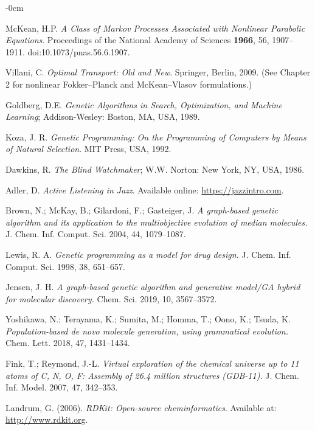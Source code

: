 \documentclass[life,article,submit,pdftex,moreauthors]{Definitions/mdpi}
\begin{document}
\begin{adjustwidth}{-\extralength}{0cm}
{\begin{thebibliography}{999}
McKean, H.P. 
\textit{A Class of Markov Processes Associated with Nonlinear Parabolic Equations}. 
Proceedings of the National Academy of Sciences \textbf{1966}, 56, 1907–1911. doi:10.1073/pnas.56.6.1907.

Villani, C. 
\textit{Optimal Transport: Old and New}. Springer, Berlin, 2009. 
(See Chapter 2 for nonlinear Fokker–Planck and McKean–Vlasov formulations.)

Goldberg, D.E. \textit{Genetic Algorithms in Search, Optimization, and Machine Learning}; Addison-Wesley: Boston, MA, USA, 1989.

Koza, J. R.
\textit{Genetic Programming: On the Programming of Computers by Means of Natural Selection}.
MIT Press, USA, 1992.

Dawkins, R. \textit{The Blind Watchmaker}; W.W. Norton: New York, NY, USA, 1986.

Adler, D. \textit{Active Listening in Jazz}. Available online: \url{https://jazzintro.com}.

Brown, N.; McKay, B.; Gilardoni, F.; Gasteiger, J.
\textit{A graph-based genetic algorithm and its application to the multiobjective
evolution of median molecules.}
J. Chem. Inf. Comput. Sci. 2004, 44, 1079--1087.

Lewis, R. A.
\textit{Genetic programming as a model for drug design.}
J. Chem. Inf. Comput. Sci. 1998, 38, 651--657.

Jensen, J. H.
\textit{A graph-based genetic algorithm and generative model/GA hybrid for molecular discovery.}
Chem. Sci. 2019, 10, 3567--3572.

Yoshikawa, N.; Terayama, K.; Sumita, M.; Homma, T.; Oono, K.; Tsuda, K.
\textit{Population-based de novo molecule generation, using grammatical evolution.}
Chem. Lett. 2018, 47, 1431--1434.

Fink, T.; Reymond, J.-L.
\textit{Virtual exploration of the chemical universe up to 11 atoms of C, N, O, F:
Assembly of 26.4 million structures (GDB-11).}
J. Chem. Inf. Model. 2007, 47, 342--353.

Landrum, G. (2006). \textit{RDKit: Open-source cheminformatics}. Available at: \url{http://www.rdkit.org}.


\end{thebibliography}}
\end{adjustwidth}
\end{document}
